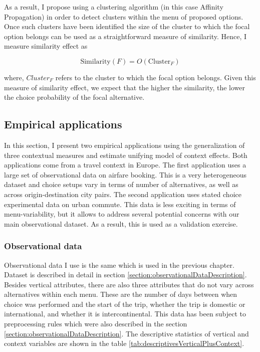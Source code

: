 \documentclass[a4paper,12pt]{article}
\begin{document}
 As a result, I propose using a clustering algorithm (in this case Affinity Propagation) in order to detect clusters within the menu of proposed options. Once such clusters have been identified the size of the cluster to which the focal option belongs can be used as a straightforward measure of similarity. Hence, I measure similarity effect as

 $$\text{Similarity}(F) = O(\text{Cluster}_F)
$$

where, $Cluster_F$ refers to the cluster to which the focal option belongs. Given this measure of similarity effect, we expect that the higher the similarity, the lower the choice probability of the focal alternative.

\subsection{Empirical applications}

In this section, I present two empirical applications using the generalization of three contextual measures and estimate unifying model of context effects. Both applications come from a travel context in Europe. The first application uses a large set of observational data on airfare booking. This is a very heterogeneous dataset and choice setups vary in terms of number of alternatives, as well as across origin-destination city pairs. The second application uses stated choice experimental data on urban commute. This data is less exciting in terms of menu-variability, but it allows to address several potential concerns with our main observational dataset. As a result, this is used as a validation exercise. 

\subsubsection{Observational data}\label{section:additionalPreprocessingObservationalData}

Observational data I use is the same which is used in the previous chapter. Dataset is described in detail in section \ref{section:observationalDataDescription}. Besides vertical attributes, there are also  three attributes that do not vary across alternatives within each menu. These are the number of days between when choice was performed and the start of the trip, whether the trip is domestic or international, and whether it is intercontinental. This data has been subject to preprocessing rules which were also described in the section \ref{section:observationalDataDescription}. The descriptive statistics of vertical and context variables are shown in the table \ref{tab:descriptivesVerticalPlusContext}.
\end{document}
